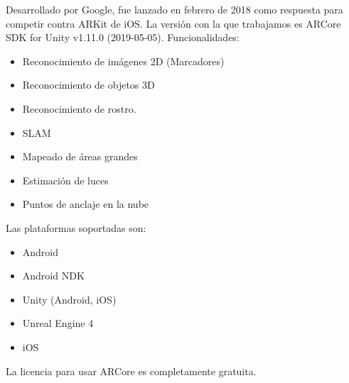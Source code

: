 Desarrollado por Google, fue lanzado en febrero de 2018 como respuesta para competir contra ARKit de iOS. La versión con la que trabajamos es ARCore SDK for Unity v1.11.0 (2019-05-05).\cite{ARCore}
Funcionalidades:
\begin{itemize}
\item Reconocimiento de imágenes 2D (Marcadores)
\item Reconocimiento de objetos 3D
\item Reconocimiento de rostro.
\end{itemize}
\begin{itemize}
\item SLAM
\item Mapeado de áreas grandes
\item Estimación de luces
\item Puntos de anclaje en la nube
\end{itemize}
Las plataformas soportadas son:
\begin{itemize}
\item Android
\item Android NDK
\item Unity (Android, iOS)
\item Unreal Engine 4
\item iOS
\end{itemize}
La licencia para usar ARCore es completamente gratuita.

